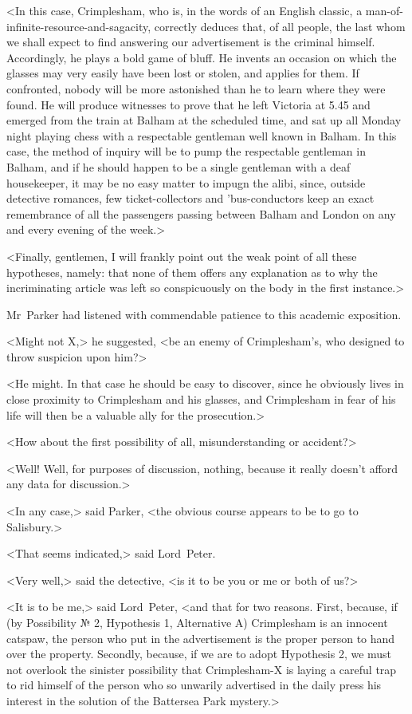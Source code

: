 <In this case, Crimplesham, who is, in the words of an English classic, a man-of-infinite-resource-and-sagacity, correctly deduces that, of all people, the last whom we shall expect to find answering our advertisement is the criminal himself. Accordingly, he plays a bold game of bluff. He invents an occasion on which the glasses may very easily have been lost or stolen, and applies for them. If confronted, nobody will be more astonished than he to learn where they were found. He will produce witnesses to prove that he left Victoria at 5.45 and emerged from the train at Balham at the scheduled time, and sat up all Monday night playing chess with a respectable gentleman well known in Balham. In this case, the method of inquiry will be to pump the respectable gentleman in Balham, and if he should happen to be a single gentleman with a deaf housekeeper, it may be no easy matter to impugn the alibi, since, outside detective romances, few ticket-collectors and 'bus-conductors keep an exact remembrance of all the passengers passing between Balham and London on any and every evening of the week.>

<Finally, gentlemen, I will frankly point out the weak point of all these hypotheses, namely: that none of them offers any explanation as to why the incriminating article was left so conspicuously on the body in the first instance.>

Mr~Parker had listened with commendable patience to this academic exposition.

<Might not X\@,> he suggested, <be an enemy of Crimplesham's, who designed to throw suspicion upon him?>

<He might. In that case he should be easy to discover, since he obviously lives in close proximity to Crimplesham and his glasses, and Crimplesham in fear of his life will then be a valuable ally for the prosecution.>

<How about the first possibility of all, misunderstanding or accident?>

<Well! Well, for purposes of discussion, nothing, because it really doesn't afford any data for discussion.>

<In any case,> said Parker, <the obvious course appears to be to go to Salisbury.>

<That seems indicated,> said Lord~Peter.

<Very well,> said the detective, <is it to be you or me or both of us?>

<It is to be me,> said Lord~Peter, <and that for two reasons. First, because, if (by Possibility № 2, Hypothesis 1, Alternative A) Crimplesham is an innocent catspaw, the person who put in the advertisement is the proper person to hand over the property. Secondly, because, if we are to adopt Hypothesis 2, we must not overlook the sinister possibility that Crimplesham-X is laying a careful trap to rid himself of the person who so unwarily advertised in the daily press his interest in the solution of the Battersea Park mystery.>

